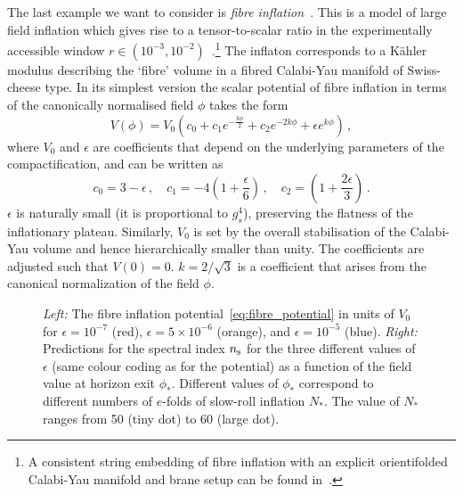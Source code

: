 \documentclass[12pt]{article}
\newcommand{\ns}{n_{\rm{s}}}
\begin{document}
The last example we want to consider is \textit{fibre inflation}~\cite{Cicoli:2008gp, Burgess:2016owb}. This is a model of large field inflation which gives rise to a tensor-to-scalar ratio in the experimentally accessible window $r \in (10^{-3}, 10^{-2})$~\cite{Cicoli:2016chb}.\footnote{A consistent string embedding of fibre inflation with an explicit orientifolded Calabi-Yau manifold and brane setup can be found in~\cite{Cicoli:2016xae}.} The inflaton corresponds to a K\"ahler modulus describing the `fibre' volume in a fibred Calabi-Yau manifold of Swiss-cheese type. In its simplest version the scalar potential of fibre inflation in terms of the canonically normalised field $\phi$ takes the form
\begin{equation}
V(\phi) = V_0 \left(c_0 + c_1 e^{-\frac{k \phi}{2}} + c_2 e^{- 2 k \phi} + \epsilon e^{k \phi}\right)\,,
\label{eq:fibre_potential}
\end{equation}
where $V_0$ and $\epsilon$ are coefficients that depend on the underlying parameters of the compactification, and can be written as
\begin{equation}
\label{eq:fibrecoefficients}
c_0 = 3 - \epsilon \,,\quad c_1 = -4 \left(1+ \frac{\epsilon}{6}\right)\,, \quad c_2 = \left(1 + \frac{2 \epsilon}{3}\right) \,.
\end{equation}
$\epsilon$ is naturally small (it is proportional to $g_s^4$), preserving the flatness of the inflationary plateau.
Similarly, $V_0$ is set by the overall stabilisation of the Calabi-Yau volume and hence hierarchically smaller than unity. The coefficients are adjusted such that $V(0) = 0$. $k = 2/\sqrt{3}$ is a coefficient that arises from the canonical normalization of the field $\phi$. 

\begin{figure}
\centering
{}
\hfill
{}
\caption{\textit{Left:} The fibre inflation potential~\eqref{eq:fibre_potential} in units of $V_0$ for $\epsilon = 10^{-7}$ (red), $\epsilon = 5\times10^{-6}$ (orange), and  $\epsilon = 10^{-5}$ (blue). \textit{Right:} Predictions for the spectral index $\ns$ for the three different values of $\epsilon$ (same colour coding as for the potential) as a function of the field value  at horizon exit $\phi_*$. Different values of $\phi_*$ correspond to different numbers of $e$-folds of slow-roll inflation $N_*$. The value of $N_*$ ranges from 50 (tiny dot) to 60 (large dot).}
\label{fig:potential}
\end{figure}
\end{document}
